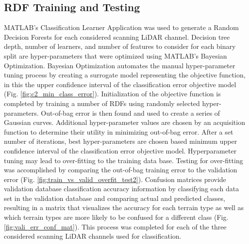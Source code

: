 \documentclass[journal,onecolumn]{IEEEtran}
\begin{document}
	
		\subsection{RDF Training and Testing}
		
	
			{MATLAB's Classification Learner Application was used to generate a Random Decision Forests for each considered scanning LiDAR channel. Decision tree depth, number of learners, and number of features to consider for each binary split are hyper-parameters that were optimized using MATLAB's Bayesian Optimization. Bayesian Optimization automates the manual hyper-parameter tuning process by creating a surrogate model representing the objective function, in this the upper confidence interval of the classification error objective model (Fig. \ref{fig:c2_min_class_error}). Initialization of the objective function is completed by training a number of RDFs using randomly selected hyper-parameters. Out-of-bag error is then found and used to create a series of Gaussian curves. Additional hyper-parameter values are chosen by an acquisition function to determine their utility in minimizing out-of-bag error. After a set number of iterations, best hyper-parameters are chosen based minimum upper confidence interval of the classification error objective model. Hyperparameter tuning may lead to over-fitting to the training data base. Testing for over-fitting was accomplished by comparing the out-of-bag training error to the validation error (Fig. \ref{fig:train_vs_valid_overfit_test2}). Confusion matrices provide validation database classification accuracy information by classifying each data set in the validation database and comparing actual and predicted classes, resulting in a matrix that visualizes the accuracy for each terrain type as well as which terrain types are more likely to be confused for a different class (Fig. \ref{fig:vali_err_conf_mat}). This process was completed for each of the three considered scanning LiDAR channels used for classification.}
	
\end{document}
